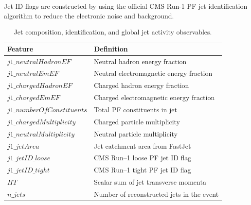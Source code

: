\documentclass[11pt,a4paper,twocolumn]{article}
\begin{document}
Jet ID flags are constructed by using the official CMS Run-1 PF jet identification algorithm to reduce the electronic noise and background.
\begin{table}[H]
\centering
\caption{Jet composition, identification, and global jet activity observables.}
\footnotesize

\begin{tabular}{ll}
\toprule
Feature & Definition \\
\midrule
$j1\_neutralHadronEF$ & Neutral hadron energy fraction \\
$j1\_neutralEmEF$     & Neutral electromagnetic energy fraction \\
$j1\_chargedHadronEF$ & Charged hadron energy fraction \\
$j1\_chargedEmEF$     & Charged electromagnetic energy fraction \\
$j1\_numberOfConstituents$ & Total PF constituents in jet \\
$j1\_chargedMultiplicity$ & Charged particle multiplicity \\
$j1\_neutralMultiplicity$ & Neutral particle multiplicity \\
$j1\_jetArea$ & Jet catchment area from FastJet \\
$j1\_jetID\_loose$ & CMS Run--1 loose PF jet ID flag \\
$j1\_jetID\_tight$ & CMS Run--1 tight PF jet ID flag \\
$HT$ & Scalar sum of jet transverse momenta \\
$n\_jets$ & Number of reconstructed jets in the event \\
\bottomrule
\end{tabular}

\end{table}
\end{document}
